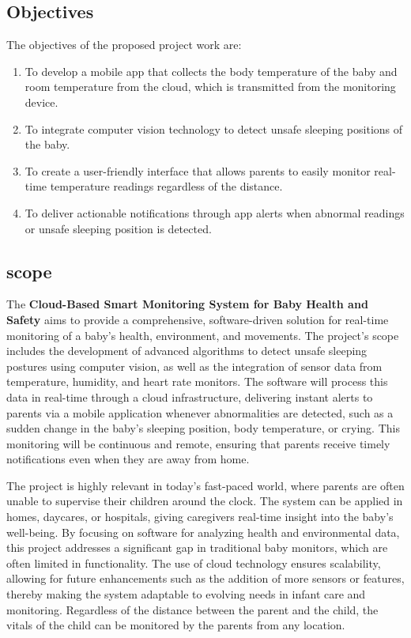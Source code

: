 \documentclass[conference]{IEEEtran}
\begin{document}
\subsection{Objectives}
The objectives of the proposed project work are:
\begin{enumerate}
    \item To develop a mobile app that collects the body temperature of the baby and room temperature from the cloud, which is transmitted from the monitoring device.
    \item To integrate computer vision technology to detect unsafe sleeping positions of the baby.
    \item To create a user-friendly interface that allows parents to easily monitor real-time temperature readings regardless of the distance.
    \item To deliver actionable notifications through app alerts when abnormal readings or unsafe sleeping position is detected.
\end{enumerate}

\subsection{scope}
The \textbf{Cloud-Based Smart Monitoring System for Baby Health and Safety} aims to provide a comprehensive, software-driven solution for real-time monitoring of a baby’s health, environment, and movements. The project’s scope includes the development of advanced algorithms to detect unsafe sleeping postures using computer vision, as well as the integration of sensor data from temperature, humidity, and heart rate monitors. The software will process this data in real-time through a cloud infrastructure, delivering instant alerts to parents via a mobile application whenever abnormalities are detected, such as a sudden change in the baby’s sleeping position, body temperature, or crying. This monitoring will be continuous and remote, ensuring that parents receive timely notifications even when they are away from home.

The project is highly relevant in today’s fast-paced world, where parents are often unable to supervise their children around the clock. The system can be applied in homes, daycares, or hospitals, giving caregivers real-time insight into the baby’s well-being. By focusing on software for analyzing health and environmental data, this project addresses a significant gap in traditional baby monitors, which are often limited in functionality. The use of cloud technology ensures scalability, allowing for future enhancements such as the addition of more sensors or features, thereby making the system adaptable to evolving needs in infant care and monitoring. Regardless of the distance between the parent and the child, the vitals of the child can be monitored by the parents from any location.
\end{document}

